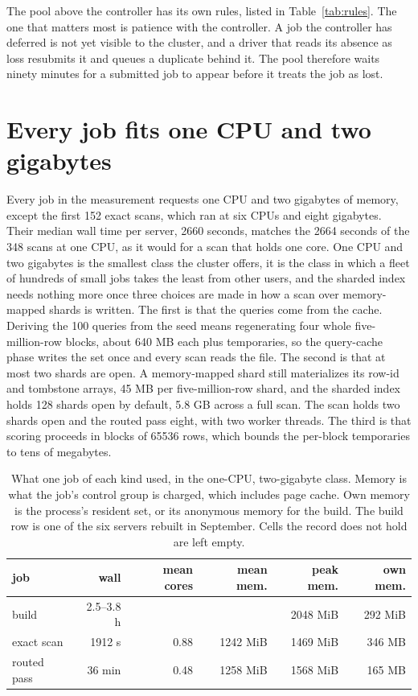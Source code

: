 \documentclass[sigconf, nonacm]{acmart}
\begin{document}
The pool above the controller has its own rules, listed in Table~\ref{tab:rules}. The one that
matters most is patience with the controller. A job the controller has deferred is not yet
visible to the cluster, and a driver that reads its absence as loss resubmits it and queues a
duplicate behind it. The pool therefore waits ninety minutes for a submitted job to appear before
it treats the job as lost.

\section{Every job fits one CPU and two gigabytes}
\label{sec:shape}

Every job in the measurement requests one CPU and two gigabytes of memory, except the first 152
exact scans, which ran at six CPUs and eight gigabytes. Their median wall time per server, 2660
seconds, matches the 2664 seconds of the 348 scans at one CPU, as it would for a scan that holds
one core. One CPU and two gigabytes is the smallest
class the cluster offers, it is the class in which a fleet of hundreds of small jobs takes the
least from other users, and the sharded index needs nothing more once three choices are made in
how a scan over memory-mapped shards is written. The first is that the queries come from the
cache. Deriving the 100 queries from the seed means regenerating four whole five-million-row
blocks, about 640 MB each plus temporaries, so the query-cache phase writes the set once and every
scan reads the file. The second is that at most two shards are open. A memory-mapped shard still
materializes its row-id and tombstone arrays, 45 MB per five-million-row shard, and the sharded
index holds 128 shards open by default, 5.8 GB across a full scan. The scan holds two shards open
and the routed pass eight, with two worker threads. The third is that scoring proceeds in blocks
of 65536 rows, which bounds the per-block temporaries to tens of megabytes.

\begin{table}[t]
\caption{What one job of each kind used, in the one-CPU, two-gigabyte class. Memory is what the
job's control group is charged, which includes page cache. Own memory is the process's resident
set, or its anonymous memory for the build. The build row is one of the six servers rebuilt in
September. Cells the record does not hold are left empty.}
\label{tab:budget}
\centering
\footnotesize
\setlength{\tabcolsep}{2.5pt}
\begin{tabular}{lrrrrr}
\toprule
job & wall & mean cores & mean mem. & peak mem. & own mem. \\
\midrule
build          & 2.5--3.8 h &      &          & 2048 MiB & 292 MiB \\
exact scan     & 1912 s     & 0.88 & 1242 MiB & 1469 MiB & 346 MB \\
routed pass    & 36 min     & 0.48 & 1258 MiB & 1568 MiB & 165 MB \\
\bottomrule
\end{tabular}
\end{table}
\end{document}

